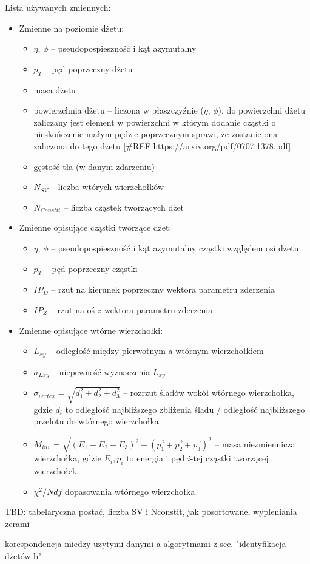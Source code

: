 Lista używanych zmiennych:
\begin{itemize}
	\item Zmienne na poziomie dżetu:
	\begin{itemize}	
		\item $\eta$, $\phi$ -- pseudopospieszność i kąt azymutalny
		\item $p_T$ -- pęd poprzeczny dżetu
		\item masa dżetu
		\item powierzchnia dżetu -- liczona w płaszczyźnie ($\eta$, $\phi$),   do powierzchni dżetu zaliczany jest element w powierzchni w którym dodanie cząstki o nieskończenie małym pędzie poprzecznym sprawi, że zostanie ona zaliczona do tego dżetu  [\#REF https://arxiv.org/pdf/0707.1378.pdf]
		\item gęstość tła (w danym zdarzeniu)
		\item $N_{SV}$ -- liczba wtórych wierzchołków
		\item $N_{Constit}$ -- liczba cząstek tworzących dżet
	\end{itemize}
	
	
	\item Zmienne opisujące cząstki tworzące dżet:
	\begin{itemize}	
		\item $\eta$, $\phi$ -- pseudopospieszność i kąt azymutalny cząstki względem osi dżetu
		\item $p_T$ -- pęd poprzeczny cząstki
		\item $IP_D$ -- rzut na kierunek poprzeczny wektora parametru zderzenia
		\item $IP_Z$ -- rzut na oś $z$ wektora parametru zderzenia
	\end{itemize}	
	
	
	\item Zmienne opisujące wtórne wierzchołki:
	\begin{itemize}	
		\item $L_{xy}$ -- odległość między pierwotnym a wtórnym wierzchołkiem 
		\item $\sigma_{Lxy}$ -- niepewność wyznaczenia $L_{xy}$
		\item $\sigma_{vertex} = \sqrt{d_1^2 + d_2^2 + d_3^2}$ -- rozrzut śladów  wokół wtórnego wierzchołka, gdzie $d_i$ to odległość najbliższego zbliżenia śladu / odległość najbliższego przelotu do wtórnego wierzchołka  %
		\item $M_{inv} = \sqrt{(E_1 + E_2 + E_3)^2 - (\vec{p_1} + \vec{p_2} + \vec{p_3})^2}$ -- masa niezmiennicza wierzchołka, gdzie $E_i, p_i$ to energia i pęd $i$-tej cząstki tworzącej wierzchołek
		\item $\chi^2/Ndf$  dopasowania wtórnego wierzchołka
	\end{itemize}
\end{itemize}





TBD: tabelaryczna postać, liczba SV i Nconstit, jak posortowane, wypleniania zerami

korespondencja miedzy uzytymi danymi a algorytmami z sec. "identyfikacja dżetów b"